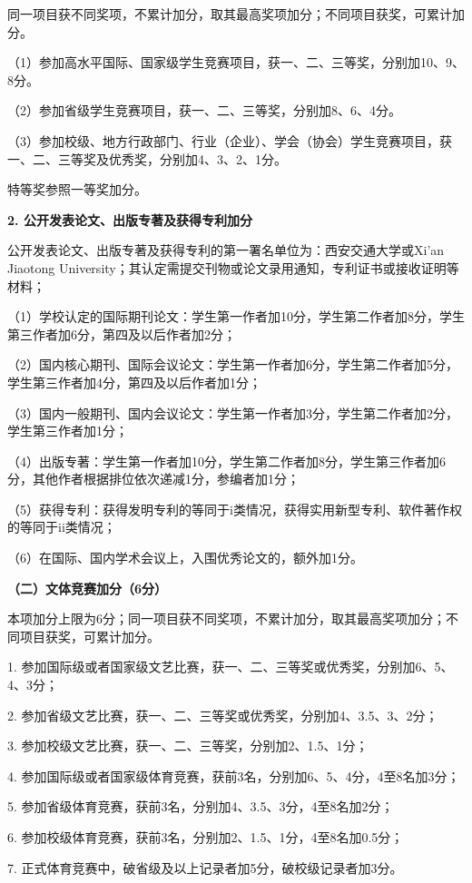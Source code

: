 \documentclass[
decoration,  %
]{qyxf-book}
\begin{document}
同一项目获不同奖项，不累计加分，取其最高奖项加分；不同项目获奖，可累计加分。

（1）参加高水平国际、国家级学生竞赛项目，获一、二、三等奖，分别加10、9、8分。

（2）参加省级学生竞赛项目，获一、二、三等奖，分别加8、6、4分。

（3）参加校级、地方行政部门、行业（企业）、学会（协会）学生竞赛项目，获一、二、三等奖及优秀奖，分别加4、3、2、1分。

特等奖参照一等奖加分。

\textbf{2. 公开发表论文、出版专著及获得专利加分}

公开发表论文、出版专著及获得专利的第一署名单位为：西安交通大学或Xi’an Jiaotong University；其认定需提交刊物或论文录用通知，专利证书或接收证明等材料；

（1）学校认定的国际期刊论文：学生第一作者加10分，学生第二作者加8分，学生第三作者加6分，第四及以后作者加2分；

（2）国内核心期刊、国际会议论文：学生第一作者加6分，学生第二作者加5分，学生第三作者加4分，第四及以后作者加1分；

（3）国内一般期刊、国内会议论文：学生第一作者加3分，学生第二作者加2分，学生第三作者加1分；

（4）出版专著：学生第一作者加10分，学生第二作者加8分，学生第三作者加6分，其他作者根据排位依次递减1分，参编者加1分；

（5）获得专利：获得发明专利的等同于i类情况，获得实用新型专利、软件著作权的等同于ii类情况；

（6）在国际、国内学术会议上，入围优秀论文的，额外加1分。

\textbf{（二）文体竞赛加分（6分）}

本项加分上限为6分；同一项目获不同奖项，不累计加分，取其最高奖项加分；不同项目获奖，可累计加分。

1. 参加国际级或者国家级文艺比赛，获一、二、三等奖或优秀奖，分别加6、5、4、3分；

2. 参加省级文艺比赛，获一、二、三等奖或优秀奖，分别加4、3.5、3、2分；

3. 参加校级文艺比赛，获一、二、三等奖，分别加2、1.5、1分；

4. 参加国际级或者国家级体育竞赛，获前3名，分别加6、5、4分，4至8名加3分；

5. 参加省级体育竞赛，获前3名，分别加4、3.5、3分，4至8名加2分；

6. 参加校级体育竞赛，获前3名，分别加2、1.5、1分，4至8名加0.5分；

7. 正式体育竞赛中，破省级及以上记录者加5分，破校级记录者加3分。
\end{document}

